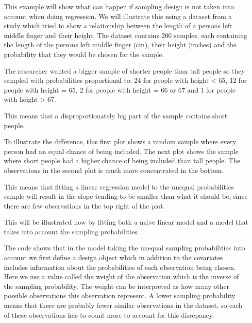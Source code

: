 \documentclass{article}
\begin{document}
\begin{example}

This example will show what can happen if sampling design is not taken
into account when doing regression. We will illustrate this using a dataset from a study which tried to show a relationship between the length of a persons left middle finger and their height. The dataset contains 200 samples, each containing the length of the persons left middle finger (cm), their height (inches) and the probability that they would be chosen for the sample.

The researcher wanted a bigger sample of shorter people than tall people so they sampled with probabilities proportional to: 24 for people with height < 65, 12 for people with height = 65, 2 for people with height = 66 or 67 and 1 for people with height > 67.

This means that a disproportionately big part of the sample contains short people. 

To illustrate the difference, this first plot shows a random sample where every
person had an equal chance of being included. The next plot shows the sample
where short people had a higher chance of being included than tall people. The
observations in the second plot is much more concentrated in the bottom.



This means that fitting a linear regression model to the unequal probabilities
sample will result in the slope tending to be smaller than what it should be, since there are few observations in the top right of the plot.

This will be illustrated now by fitting both a naive linear model and a model that takes into account the sampling probabilities.



The code shows that in the model taking the unequal sampling probabilities into account we first define a design object which in addition to the covariates includes information about the probabilities of each observation being chosen. Here we use a value called the weight of the observation which is the inverse of the sampling probability. The weight can be interpreted as how many other possible observations this observation represent. A lower sampling probability means that there are probably fewer similar observations in the dataset, so each of these observations has to count more to account for this disrepancy.


\end{example}
\end{document}
